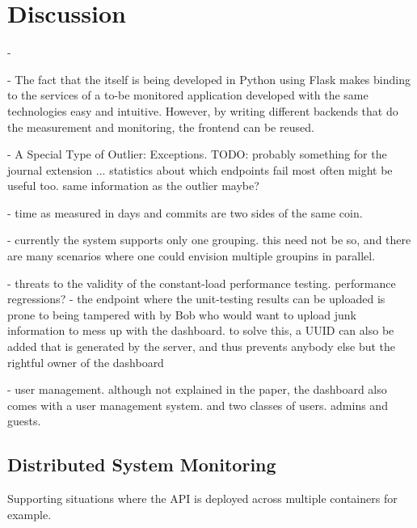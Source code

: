 
\section{Discussion}

-   

-   The fact that the \tool itself is being developed in Python using Flask makes binding to the services of a to-be monitored application developed with the same technologies easy and intuitive. However, by writing different backends that do the measurement and monitoring, the frontend can be reused.

- A Special Type of Outlier: Exceptions. TODO: probably something for the journal extension ...
  statistics about which endpoints fail most often might be useful too.
  same information as the outlier maybe?

- time as measured in days and commits are two sides of the same coin. 

- currently the system supports only one grouping. this need not be so, and there are many scenarios where one could envision multiple groupins in parallel.

- threats to the validity of the constant-load performance testing. performance regressions? 
- the endpoint where the unit-testing results can be uploaded is prone to being tampered with by Bob who would want to upload junk information to mess up with the dashboard. to solve this, a UUID can also be added that is generated by the server, and thus prevents anybody else but the rightful owner of the dashboard 

- user management. although not explained in the paper, the dashboard also comes with a user management system. and two classes of users. admins and guests.




  \subsection{Distributed System Monitoring}
  Supporting situations where the API is deployed across multiple containers for example.


